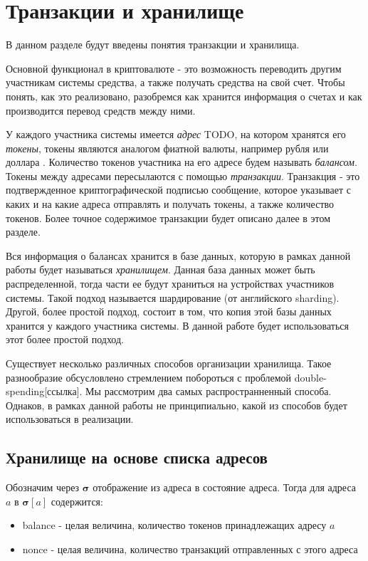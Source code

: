 \section{Транзакции и хранилище}
В данном разделе будут введены понятия транзакции и хранилища. 

Основной функционал в криптовалюте - это возможность переводить другим участникам системы средства, а также получать средства на свой счет.
Чтобы понять, как это реализовано, разобремся как хранится информация о счетах и как производится перевод средств между ними.

У каждого участника системы имеется \textit{адрес} TODO, на котором хранятся его \textit{токены}, токены
являются аналогом фиатной валюты, например рубля или доллара . Количество токенов участника на его адресе будем называть \textit{балансом}. Токены между адресами пересылаются с помощью \textit{транзакции}. Транзакция - это подтвержденное криптографической подписью сообщение, которое указывает с каких и на какие адреса отправлять и получать токены, а также количество токенов. Более точное содержимое транзакции будет описано далее в этом разделе.

Вся информация о балансах хранится в базе данных, которую в рамках данной работы будет называться \textit{хранилищем}.
Данная база данных может быть распределенной, тогда части ее будут храниться на устройствах участников системы. 
Такой подход называется шардирование (от английского sharding). 
Другой, более простой подход, состоит в том, что копия этой базы данных хранится у каждого участника системы.
В данной работе будет использоваться этот более простой подход.

Существует несколько различных способов организации хранилища.
Такое разнообразие обсусловлено стремлением побороться  с проблемой double-spending[ссылка].
Мы рассмотрим два самых распространненный способа. 
Однаков, в рамках данной работы не принципиально, какой из способов будет использоваться в реализации.

\subsection{Хранилище на основе списка адресов}
Обозначим через $\boldsymbol{\sigma}$ отображение из адреса в состояние адреса. Тогда для адреса $a$ в $\boldsymbol{\sigma}[a]$ содержится:
\begin{itemize}
\item balance - целая величина, количество токенов принадлежащих адресу $a$
\item nonce  - целая величина, количество транзакций отправленных с этого адреса
\end{itemize}

